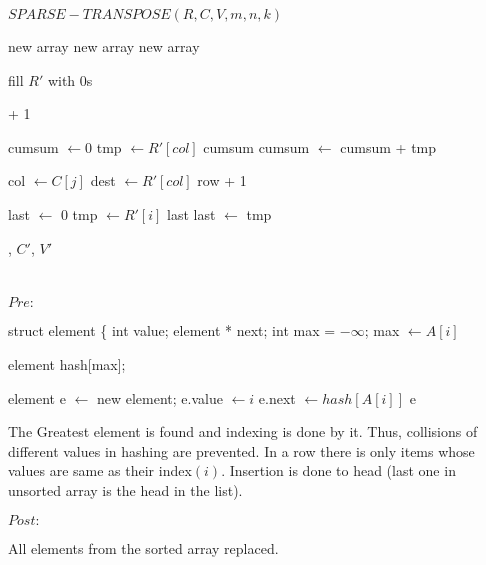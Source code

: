 \documentclass{article}
\begin{document}
{$SPARSE-TRANSPOSE(R, C, V, m, n, k)$}
\begin{algorithmic}
 new array
 new array
 new array

\STATE

\STATE fill {$R'$} with {$0$}s

\STATE

     + 1
\ENDFOR

\STATE

\STATE cumsum {$\gets 0$}
    \STATE tmp {$\gets R'[col]$}
     cumsum
    \STATE cumsum {$\gets$} cumsum + tmp
\ENDFOR

\STATE

        \STATE col {$\gets C[j]$} 
        \STATE dest {$\gets R'[col]$}
         row
         + 1
    \ENDFOR
\ENDFOR

\STATE

\STATE last {$\gets$} 0
    \STATE tmp {$\gets R'[i]$}
     last
    \STATE last {$\gets$} tmp
\ENDFOR

\STATE

, {$C'$}, {$V'$}

\end{algorithmic}

\newpage

\section{}
{$Pre:$}

\begin{algorithmic}
\STATE struct element \{
\STATE \quad int value;
\STATE \quad element * next;
\STATE {\}}
\STATE int max = {$-\infty$};
        \STATE max {$\gets A[i]$}
    \ENDIF
\ENDFOR

\STATE element hash[max];

    \STATE element e {$\gets$} new element;
    \STATE e.value {$\gets i$}
    \STATE e.next {$\gets hash[A[i]]$}
     e
\ENDFOR
\STATE
\end{algorithmic}

The Greatest element is found and indexing is done by it. Thus, collisions of different values in hashing are prevented. In a row there is only items whose values are same as their index{$(i)$}. Insertion is done to head (last one in unsorted array is the head in the list).

\[\]
\newline 
{$Post:$}

\begin{algorithmic}
\ENDFOR
\STATE
\end{algorithmic}

All elements from the sorted array replaced.
\end{document}
